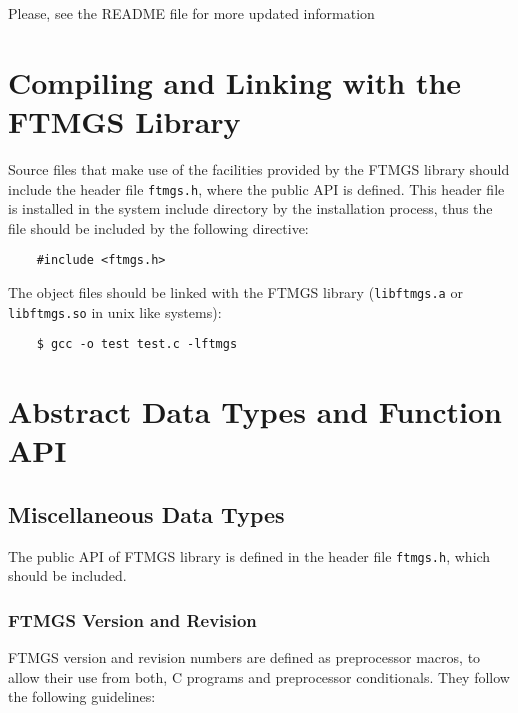 \documentclass[a4paper]{article}
\begin{document}
Please, see the README file for more updated information

\section{Compiling and Linking with the FTMGS Library}

Source files that make use of the facilities provided by the FTMGS
library should include the header file \verb|ftmgs.h|, where the
public API is defined. This header file is installed in the system
include directory by the installation process, thus the file should be
included by the following directive:
\begin{verbatim}
    #include <ftmgs.h>
\end{verbatim}

The object files should be linked with the FTMGS library
(\verb|libftmgs.a| or \verb|libftmgs.so| in unix like systems):
\begin{verbatim}
    $ gcc -o test test.c -lftmgs
\end{verbatim}

\section{Abstract Data Types and Function API}

\subsection{Miscellaneous Data Types}

The public API of FTMGS library is defined in the header file
\verb|ftmgs.h|, which should be included.

\subsubsection*{FTMGS Version and Revision}

FTMGS version and revision numbers are defined as preprocessor macros,
to allow their use from both, C programs and preprocessor
conditionals. They follow the following guidelines:
\end{document}
